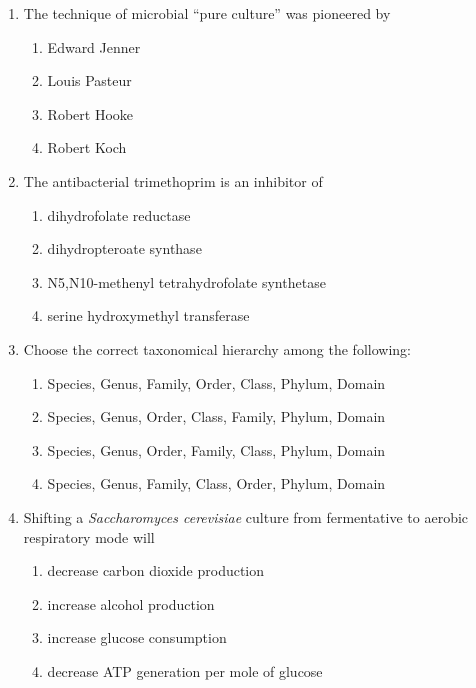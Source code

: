 \documentclass[journal,12pt,onecolumn]{IEEEtran}
\begin{document}
\begin{enumerate}[label=\arabic*.]

\item The technique of microbial ``pure culture'' was pioneered by
\begin{multicols}{4}
\begin{enumerate}[label=(\Alph*)]
\item Edward Jenner
\item Louis Pasteur
\item Robert Hooke
\item Robert Koch
\end{enumerate}
\end{multicols}

\item The antibacterial trimethoprim is an inhibitor of
\begin{multicols}{2}
\begin{enumerate}[label=(\Alph*)]
\item dihydrofolate reductase
\item dihydropteroate synthase
\item N5,N10-methenyl tetrahydrofolate synthetase
\item serine hydroxymethyl transferase
\end{enumerate}
\end{multicols}

\item Choose the correct taxonomical hierarchy among the following:
\begin{enumerate}[label=(\Alph*)]
\item Species, Genus, Family, Order, Class, Phylum, Domain
\item Species, Genus, Order, Class, Family, Phylum, Domain
\item Species, Genus, Order, Family, Class, Phylum, Domain
\item Species, Genus, Family, Class, Order, Phylum, Domain
\end{enumerate}

\item Shifting a \textit{Saccharomyces cerevisiae} culture from fermentative to aerobic respiratory mode will
\begin{enumerate}[label=(\Alph*)]
\item decrease carbon dioxide production
\item increase alcohol production
\item increase glucose consumption
\item decrease ATP generation per mole of glucose
\end{enumerate}


\end{enumerate}
\end{document}

